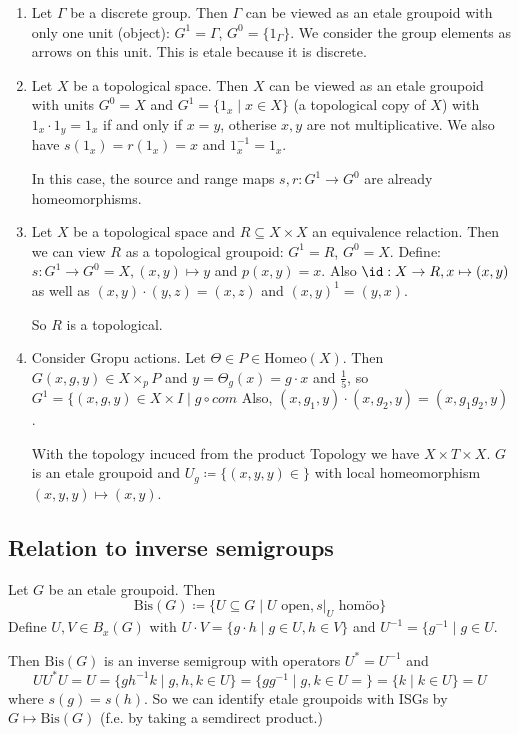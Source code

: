 \documentclass[a4paper]{article}
\begin{document}
\begin{example}
	\begin{enumerate}
		\item Let $\Gamma$ be a discrete group.
		Then $\Gamma$ can be viewed as an etale groupoid with only one unit (object): $G^1 = \Gamma$, $G^0 = \{1_\Gamma\}$.
		We consider the group elements as arrows on this unit.
		This is etale because it is discrete.
		\item Let $X$ be a topological space.
		Then $X$ can be viewed as an etale groupoid with units $G^0 = X$ and $G^1 = \{1_x \mid x \in X\}$ (a topological copy of $X$) with $1_x \cdot 1_y = 1_x$ if and only if $x = y$, otherise $x,y$ are not multiplicative.
		We also have $s(1_x) = r(1_x) = x$ and $1_x^{-1} = 1_x$.

		In this case, the source and range maps $s,r: G^1 \to G^0$ are already homeomorphisms.
		\item Let $X$ be a topological space and $R \subseteq X \times X$ an equivalence relaction.
		Then we can view $R$ as a topological groupoid: $G^1 = R$, $G^0 = X$.
		Define: $s: G^1 \to G^0 = X, (x,y) \mapsto y$ and $p(x,y) =x$.
		Also $\id: X \to R, x \mapsto (x,y)$ as well as $(x,y) \cdot (y,z) = (x,z)$ and $(x,y)^{1} = (y,x)$.

		So $R$ is a topological.
		\item Consider Gropu actions. Let $\Theta \in P \in \mathrm{Homeo}(X)$.
		Then $G (x,g,y) \in X \times_p P$ and $y = \Theta_g(x) = g \cdot x$ and $\frac{1}{5}$, so $G^1 = \{(x,g,y) \in X \times \hat{I} \mid g \circ com$
		Also, $(x, g_1, y) \cdot (x, g_2, y) = (x, g_1 g_2, y)$.

		With the topology incuced from the product Topology we have $X \times T \times X$.
		$G$ is an etale groupoid and $U_g \coloneq \{ (x,y,y) \in \}$ with local homeomorphism  $(x,y,y)\mapsto (x,y) $.

	 	\end{enumerate}
\end{example}

\subsection{Relation to inverse semigroups}

\begin{theorem}
	Let $G$ be an etale groupoid.
	Then
	\begin{equation*}
		\mathrm{Bis}(G) \coloneq \{U \subseteq G \mid U \text{ open}, s|_U \text{ homöo} \}
	\end{equation*}
	Define $U,V \in B_x(G)$ with $U \cdot V = \{ g \cdot h \mid g \in U , h \in V \}$ and $U^{-1} = \{ g^{-1} \mid g \in U$.

	Then $\mathrm{Bis}(G)$ is an inverse semigroup with operators $U^* = U^{-1}$ and 
	\begin{equation*}
		U U^* U = U = \{g h^{-1} k \mid g, h, k \in U \}  = \{g g^{-1} \mid g, k \in U= \} = \{k \mid k \in U\} = U
	\end{equation*}
	where $s(g) = s(h)$.
	So we can identify etale groupoids with ISGs by $G \mapsto \mathrm{Bis}(G)$ (f.e. by taking a semdirect product.)
\end{theorem}
\end{document}
